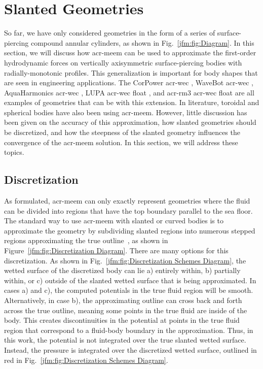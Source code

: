 \documentclass[lineno]{JFM-FLM_Au}
\begin{document}
\section{Slanted Geometries}\label{jfm:sec:slant}
So far, we have only considered geometries in the form of a series of surface-piercing compound annular cylinders, as shown in Fig.~\ref{jfm:fig:Diagram}. 
In this section, we will discuss how \gls{acr-meem} can be used to approximate the first-order hydrodynamic forces on vertically axisymmetric surface-piercing bodies with radially-monotonic profiles. 
This generalization is important for \modelling{} body shapes that are seen in engineering applications. 
The CorPower \gls{acr-wec} \citep{de2016techno}, WaveBot \gls{acr-wec} \citep{strofer2023control}, AquaHarmonics \gls{acr-wec} \citep{weaver2020super}, LUPA \gls{acr-wec} float \citep{beringer2025degrees}, and \gls{acr-rm3} \gls{acr-wec} float \citep{neary2014methodology} are all examples of geometries that can be \modelled{} with this extension. 
In literature, toroidal \citep{mavrakos1997hydrodynamic} and spherical bodies \citep{zhang_hydrodynamic_2016} have also been \modelled{} using \gls{acr-meem}. 
However, little discussion has been given on the accuracy of this approximation, how slanted geometries should be discretized, and how the steepness of the slanted geometry influences the convergence of the \gls{acr-meem} solution. 
In this section, we will address these topics.

\subsection{Discretization}

As formulated, \gls{acr-meem} can only exactly represent geometries where the fluid can be divided into regions that have the top boundary parallel to the sea floor.
The standard way to use \gls{acr-meem} with slanted or curved bodies is to approximate the geometry by subdividing slanted regions into numerous stepped regions approximating the true outline~\citep{kokkinowrachos_behaviour_1986}, as shown in Figure~\ref{jfm:fig:Discretization Diagram}.
There are many options for this discretization.
As shown in Fig.~\ref{jfm:fig:Discretization Schemes Diagram}, the wetted surface of the discretized body \modelled{} can lie a) entirely within, b) partially within, or c) outside of the slanted wetted surface that is being approximated.
In cases a) and c), the computed potentials in the true fluid region will be smooth.
Alternatively, in case b), the approximating outline can cross back and forth across the true outline, meaning some points in the true fluid are inside of the body.
This creates discontinuities in the potential at points in the true fluid region that correspond to a fluid-body boundary in the approximation.
Thus, in this work, the potential is not integrated over the true slanted wetted surface.
Instead, the pressure is integrated over the discretized wetted surface, outlined in red in Fig.~\ref{jfm:fig:Discretization Schemes Diagram}.
\end{document}
